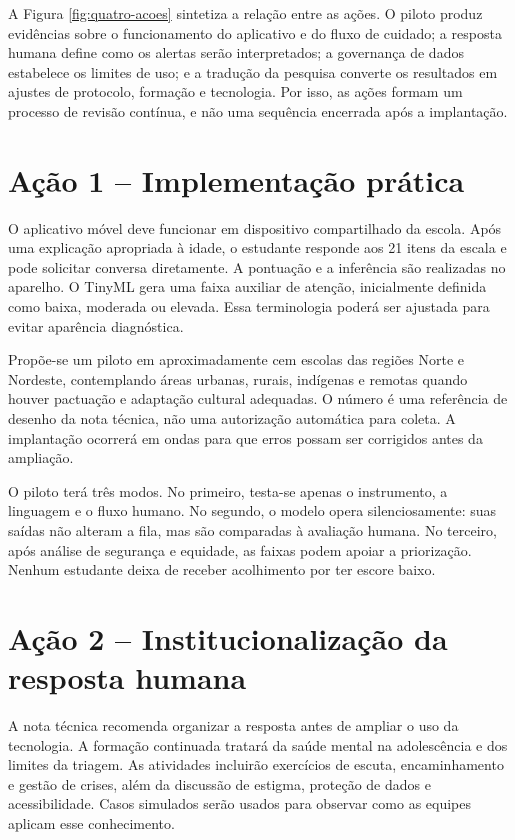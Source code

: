 \documentclass[
  12pt,
  openright,
  oneside,
  a4paper,
  english,
  brazil
]{abntex2}
\begin{document}
A Figura \ref{fig:quatro-acoes} sintetiza a relação entre as ações. O piloto
produz evidências sobre o funcionamento do aplicativo e do fluxo de cuidado; a
resposta humana define como os alertas serão interpretados; a governança de
dados estabelece os limites de uso; e a tradução da pesquisa converte os
resultados em ajustes de protocolo, formação e tecnologia. Por isso, as ações
formam um processo de revisão contínua, e não uma sequência encerrada após a
implantação.

\section{Ação 1 -- Implementação prática}

O aplicativo móvel deve funcionar em dispositivo compartilhado da escola. Após
uma explicação apropriada à idade, o estudante responde aos 21 itens da escala e
pode solicitar conversa diretamente. A pontuação e a inferência são realizadas
no aparelho. O TinyML gera uma faixa auxiliar de atenção, inicialmente definida
como baixa, moderada ou elevada. Essa terminologia poderá ser ajustada para
evitar aparência diagnóstica.

Propõe-se um piloto em aproximadamente cem escolas das regiões Norte e Nordeste,
contemplando áreas urbanas, rurais, indígenas e remotas quando houver pactuação e
adaptação cultural adequadas. O número é uma referência de desenho da nota
técnica, não uma autorização automática para coleta. A implantação ocorrerá em
ondas para que erros possam ser corrigidos antes da ampliação.

O piloto terá três modos. No primeiro, testa-se apenas o instrumento, a linguagem
e o fluxo humano. No segundo, o modelo opera silenciosamente: suas saídas não
alteram a fila, mas são comparadas à avaliação humana. No terceiro, após análise
de segurança e equidade, as faixas podem apoiar a priorização. Nenhum estudante
deixa de receber acolhimento por ter escore baixo.

\section{Ação 2 -- Institucionalização da resposta humana}

A nota técnica recomenda organizar a resposta antes de ampliar o uso da
tecnologia. A formação continuada tratará da saúde mental na adolescência e dos
limites da triagem. As atividades incluirão exercícios de escuta,
encaminhamento e gestão de crises, além da discussão de estigma, proteção de
dados e acessibilidade. Casos simulados serão usados para observar como as
equipes aplicam esse conhecimento.
\end{document}
